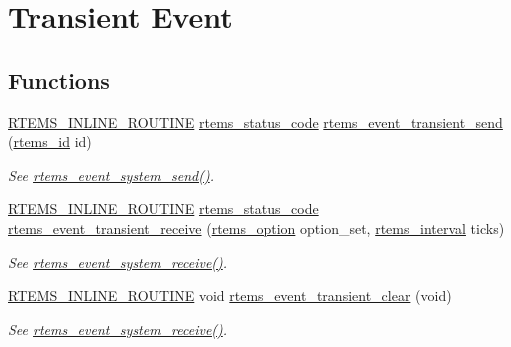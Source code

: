 \hypertarget{group__ClassicEventTransient}{}\section{Transient Event}
\label{group__ClassicEventTransient}
\subsection*{Functions}
\begin{DoxyCompactItemize}
\item 
\mbox{\hyperlink{group__RTEMSScoreBaseDefs_gac216239df231d5dbd15e3520b0b9313f}{R\+T\+E\+M\+S\+\_\+\+I\+N\+L\+I\+N\+E\+\_\+\+R\+O\+U\+T\+I\+NE}} \mbox{\hyperlink{group__ClassicStatus_ga545d41846817eaba6143d52ee4d9e9fe}{rtems\+\_\+status\+\_\+code}} \mbox{\hyperlink{group__ClassicEventTransient_gab2d8a49e579d5eb1f71f499230ed9808}{rtems\+\_\+event\+\_\+transient\+\_\+send}} (\mbox{\hyperlink{group__ClassicTasks_gab20892b814dced7dd4e5b9bf42becd57}{rtems\+\_\+id}} id)
\begin{DoxyCompactList}\small\item\em See \mbox{\hyperlink{group__ClassicEventSystem_ga1119cb4341890e86ffa7cc7fad414f19}{rtems\+\_\+event\+\_\+system\+\_\+send()}}. \end{DoxyCompactList}\item 
\mbox{\hyperlink{group__RTEMSScoreBaseDefs_gac216239df231d5dbd15e3520b0b9313f}{R\+T\+E\+M\+S\+\_\+\+I\+N\+L\+I\+N\+E\+\_\+\+R\+O\+U\+T\+I\+NE}} \mbox{\hyperlink{group__ClassicStatus_ga545d41846817eaba6143d52ee4d9e9fe}{rtems\+\_\+status\+\_\+code}} \mbox{\hyperlink{group__ClassicEventTransient_ga9a9d65005be8b07ee557eef07de4b501}{rtems\+\_\+event\+\_\+transient\+\_\+receive}} (\mbox{\hyperlink{group__ClassicOptions_gad26685eb0e60a9650082935c31920e29}{rtems\+\_\+option}} option\+\_\+set, \mbox{\hyperlink{group__ClassicTasks_gad39c43f949683d46874e3a5586b93aee}{rtems\+\_\+interval}} ticks)
\begin{DoxyCompactList}\small\item\em See \mbox{\hyperlink{group__ClassicEventSystem_ga10c79eebe1e9c1b00eb72017bb67daf7}{rtems\+\_\+event\+\_\+system\+\_\+receive()}}. \end{DoxyCompactList}\item 
\mbox{\hyperlink{group__RTEMSScoreBaseDefs_gac216239df231d5dbd15e3520b0b9313f}{R\+T\+E\+M\+S\+\_\+\+I\+N\+L\+I\+N\+E\+\_\+\+R\+O\+U\+T\+I\+NE}} void \mbox{\hyperlink{group__ClassicEventTransient_ga5fd6be98f54e9aa634dbb203902b8676}{rtems\+\_\+event\+\_\+transient\+\_\+clear}} (void)
\begin{DoxyCompactList}\small\item\em See \mbox{\hyperlink{group__ClassicEventSystem_ga10c79eebe1e9c1b00eb72017bb67daf7}{rtems\+\_\+event\+\_\+system\+\_\+receive()}}. \end{DoxyCompactList}\end{DoxyCompactItemize}


